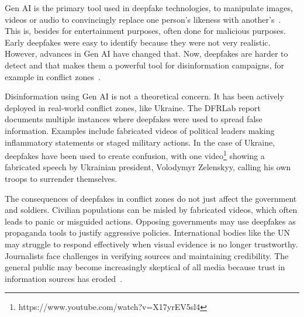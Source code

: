 
Gen AI is the primary tool used in deepfake technologies, to manipulate images, videos or audio to convincingly replace one person's likeness with another's~\citep{muam2026role}. This is, besides for entertainment purposes, often done for malicious purposes. Early deepfakes were easy to identify because they were not very realistic. However, advances in Gen AI have changed that. Now, deepfakes are harder to detect and that makes them a powerful tool for disinformation campaigns, for example in conflict zones~\citep{laws14060083,muam2026role}.


Disinformation using Gen AI is not a theoretical concern. It has been actively deployed in real-world conflict zones, like Ukraine. The DFRLab report~\citep{osadchuk2024ai} documents multiple instances where deepfakes were used to spread false information. Examples include fabricated videos of political leaders making inflammatory statements or staged military actions. In the case of Ukraine, deepfakes have been used to create confusion, with one video\footnote{https://www.youtube.com/watch?v=X17yrEV5sl4} showing a fabricated speech by Ukrainian president, Volodymyr Zelenskyy, calling his own troops to surrender themselves.


The consequences of deepfakes in conflict zones do not just affect the government and soldiers. Civilian populations can be misled by fabricated videos, which often leads to panic or misguided actions. Opposing governments may use deepfakes as propaganda tools to justify aggressive policies. International bodies like the UN may struggle to respond effectively when visual evidence is no longer trustworthy. Journalists face challenges in verifying sources and maintaining credibility. The general public may become increasingly skeptical of all media because trust in information sources has eroded~\citep{muam2026role,laws14060083}.


